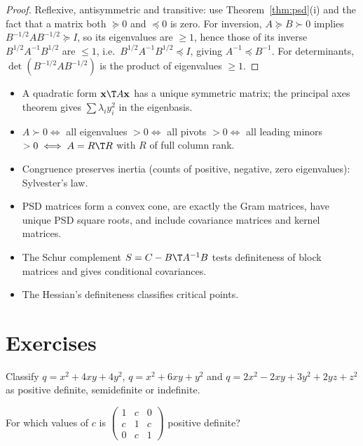 \begin{proof}
Reflexive, antisymmetric and transitive: use Theorem~\ref{thm:psd}(i) and the fact that a matrix both $\succeq0$ and $\preceq0$ is zero. For inversion, $A\succeq B\succ0$ implies $B^{-1/2}AB^{-1/2}\succeq I$, so its eigenvalues are $\ge1$, hence those of its inverse $B^{1/2}A^{-1}B^{1/2}$ are $\le1$, i.e.\ $B^{1/2}A^{-1}B^{1/2}\preceq I$, giving $A^{-1}\preceq B^{-1}$. For determinants, $\det(B^{-1/2}AB^{-1/2})$ is the product of eigenvalues $\ge1$.
\end{proof}

\begin{summarybox}
\begin{itemize}
  \item A quadratic form $\mathbf{x}\T A\mathbf{x}$ has a unique symmetric matrix; the principal axes theorem gives $\sum\lambda_iy_i^2$ in the eigenbasis.
  \item $A\succ0\iff$ all eigenvalues $>0\iff$ all pivots $>0\iff$ all leading minors $>0\iff A=R\T R$ with $R$ of full column rank.
  \item Congruence preserves inertia (counts of positive, negative, zero eigenvalues): Sylvester's law.
  \item PSD matrices form a convex cone, are exactly the Gram matrices, have unique PSD square roots, and include covariance matrices and kernel matrices.
  \item The Schur complement $S=C-B\T A^{-1}B$ tests definiteness of block matrices and gives conditional covariances.
  \item The Hessian's definiteness classifies critical points.
\end{itemize}
\end{summarybox}

\section{Exercises}

\begin{exercise}
Classify $q=x^2+4xy+4y^2$, $q=x^2+6xy+y^2$ and $q=2x^2-2xy+3y^2+2yz+z^2$ as positive definite, semidefinite or indefinite.
\end{exercise}

\begin{exercise}
For which values of $c$ is $\begin{pmatrix}1&c&0\\c&1&c\\0&c&1\end{pmatrix}$ positive definite?
\end{exercise}

